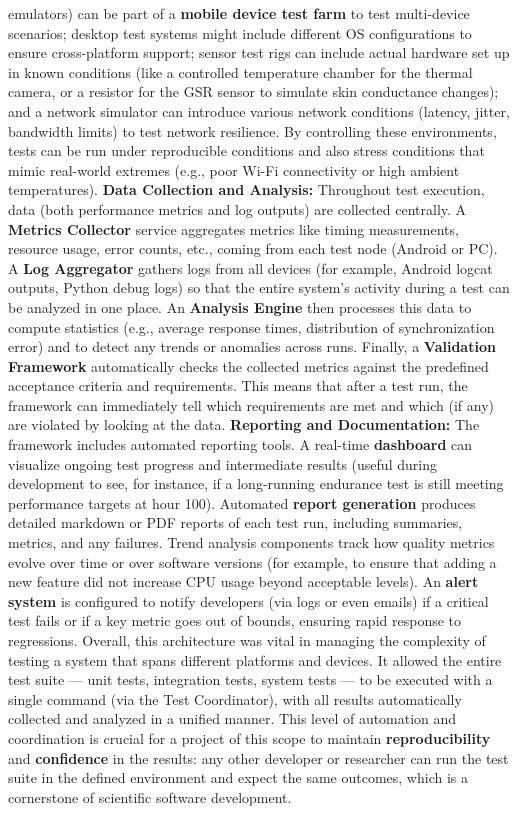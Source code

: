 emulators) can be part of a \textbf{mobile device test farm} to test multi-device scenarios; desktop test systems might include different OS configurations to ensure cross-platform support; sensor test rigs can include actual hardware set up in known conditions (like a controlled temperature chamber for the thermal camera, or a resistor for the GSR sensor to simulate skin conductance changes); and a network simulator can introduce various network conditions (latency, jitter, bandwidth limits) to test network resilience. By controlling these environments, tests can be run under reproducible conditions and also stress conditions that mimic real-world extremes (e.g., poor Wi-Fi connectivity or high ambient temperatures). \textbf{Data Collection and Analysis:} Throughout test execution, data (both performance metrics and log outputs) are collected centrally. A \textbf{Metrics Collector} service aggregates metrics like timing measurements, resource usage, error counts, etc., coming from each test node (Android or PC). A \textbf{Log Aggregator} gathers logs from all devices (for example, Android logcat outputs, Python debug logs) so that the entire system's activity during a test can be analyzed in one place. An \textbf{Analysis Engine} then processes this data to compute statistics (e.g., average response times, distribution of synchronization error) and to detect any trends or anomalies across runs. Finally, a \textbf{Validation Framework} automatically checks the collected metrics against the predefined acceptance criteria and requirements. This means that after a test run, the framework can immediately tell which requirements are met and which (if any) are violated by looking at the data. \textbf{Reporting and Documentation:} The framework includes automated reporting tools. A real-time \textbf{dashboard} can visualize ongoing test progress and intermediate results (useful during development to see, for instance, if a long-running endurance test is still meeting performance targets at hour 100). Automated \textbf{report generation} produces detailed markdown or PDF reports of each test run, including summaries, metrics, and any failures. Trend analysis components track how quality metrics evolve over time or over software versions (for example, to ensure that adding a new feature did not increase CPU usage beyond acceptable levels). An \textbf{alert system} is configured to notify developers (via logs or even emails) if a critical test fails or if a key metric goes out of bounds, ensuring rapid response to regressions. Overall, this architecture was vital in managing the complexity of testing a system that spans different platforms and devices. It allowed the entire test suite --- unit tests, integration tests, system tests --- to be executed with a single command (via the Test Coordinator), with all results automatically collected and analyzed in a unified manner. This level of automation and coordination is crucial for a project of this scope to maintain \textbf{reproducibility} and \textbf{confidence} in the results: any other developer or researcher can run the test suite in the defined environment and expect the same outcomes, which is a cornerstone of scientific software development. 